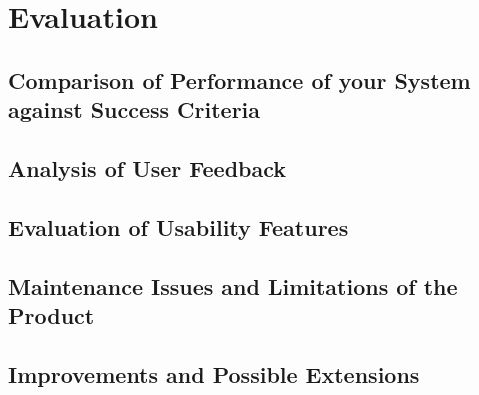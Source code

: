 \documentclass[11pt]{article}
\begin{document}
    \section{Evaluation}
        \subsection{Comparison of Performance of your System against Success Criteria}
        \subsection{Analysis of User Feedback}
        \subsection{Evaluation of Usability Features}
        \subsection{Maintenance Issues and Limitations of the Product}
        \subsection{Improvements and Possible Extensions}
        
\end{document}
